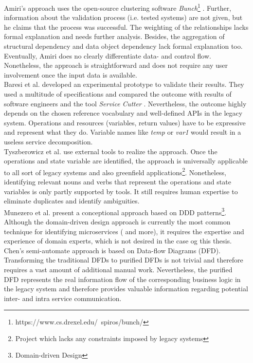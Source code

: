Amiri's approach \cite{ObjectAwareAmiri} uses the open-source clustering software \textit{Bunch}\footnote{https://www.cs.drexel.edu/~spiros/bunch/} . Further, information about the validation process (i.e. tested systems) are not given, but he claims that the process was successful. The weighting of the relationships lacks formal explanation and needs further analysis. Besides, the aggregation of structural dependency and data object dependency lack formal explanation too. 
Eventually, Amiri does no clearly differentiate data- and control flow.
Nonetheless, the approach is straightforward and does not require any user involvement once the input data is available. \\

Baresi et al. \cite{interfaceAnalysisBaresi} developed an experimental prototype to validate their results. They used a multitude of specifications and compared the outcome  with results of software engineers and the tool \textit{Service Cutter} \cite{ServiceCutter}. Nevertheless, the outcome highly depends on the chosen reference vocabulary and  well-defined APIs in the legacy system. Operations and resources (variables, return values) have to be expressive and represent what they do. Variable names like \textit{temp} or \textit{var1} would result in a useless service decomposition. \\

Tyszberowicz et al. \cite{FunctionalDecompositionHeinrich} use external tools to realize the approach. Once the operations and state variable are identified, the approach is universally applicable to all sort of legacy systems and also greenfield applications\footnote{Project which lacks any constraints imposed by legacy systems}. Nonetheless, identifying relevant nouns and verbs that represent the operations and state variables is only partly supported by tools. It still requires human expertise to eliminate duplicates and identify ambiguities. \\

Munezero et al. present a conceptional approach based on DDD patterns\footnote{Domain-driven Design}. Although the domain-driven design approach is currently the most common technique for identifying microservices (\cite{FunctionalDecompositionHeinrich}\cite{Fowler}\cite{MigratingTowardsSurvey} and more), it requires the expertise and experience of domain experts, which is not desired in the case og this thesis.\\

Chen's semi-automate approach \cite{DataflowDrivenChen} is based on Data-flow Diagrams (DFD). Transforming the traditional DFDs to purified DFDs is not trivial and therefore requires a vast amount of additional manual work. Nevertheless, the purified DFD represents the real information flow of the corresponding business logic in the legacy system and therefore provides valuable information regarding potential inter- and intra service communication. \\

